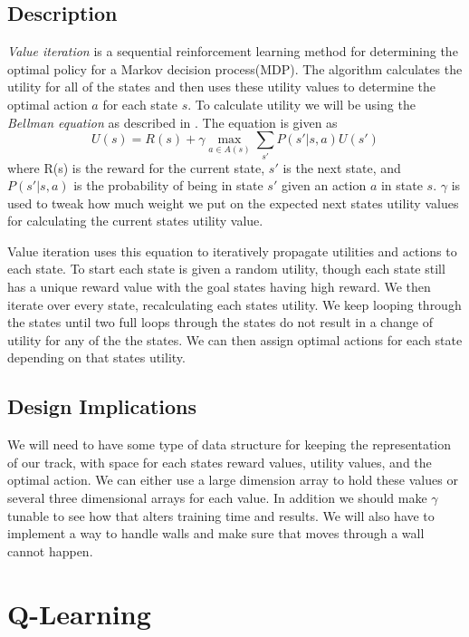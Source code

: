 \documentclass{article}
\begin{document}
		\subsection{Description}
			\textit{Value iteration} is a sequential reinforcement learning method for determining the optimal policy for a Markov decision process(MDP)\cite{Yu2013}. The algorithm calculates the utility for all of the states and then uses these utility values to determine the optimal action $a$ for each state $s$. To calculate utility we will be using the \textit{Bellman equation} as described in \cite{ai}. The equation is given as			
			\begin{equation}
				U(s) = R(s) + \gamma \max_{a \in A(s)}\sum_{s'} P(s'|s,a)U(s')
			\end{equation}
			where R(s) is the reward for the current state, $s'$ is the next state, and $P(s'|s,a)$ is the probability of being in state $s'$ given an action $a$ in state $s$. $\gamma$ is used to tweak how much weight we put on the expected next states utility values for calculating the current states utility value.
			
			Value iteration uses this equation to iteratively propagate utilities and actions to each state. To start each state is given a random utility, though each state still has a unique reward value with the goal states having high reward. We then iterate over every state, recalculating each states utility. We keep looping through the states until two full loops through the states do not result in a change of utility for any of the the states. We can then assign optimal actions for each state depending on that states utility.
		\subsection{Design Implications}
			We will need to have some type of data structure for keeping the representation of our track, with space for each states reward values, utility values, and the optimal action. We can either use a large dimension array to hold these values or several three dimensional arrays for each value. In addition we should make $\gamma$ tunable to see how that alters training time and results. We will also have to implement a way to handle walls and make sure that moves through a wall cannot happen.	
	\section{Q-Learning}
\end{document}

